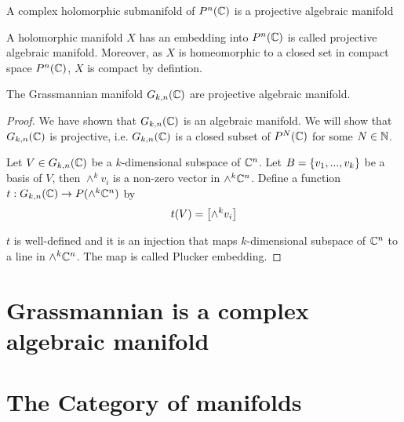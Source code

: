 \begin{theorem}
	A complex holomorphic submanifold of $P^n(\C)$ is a projective algebraic manifold
\end{theorem}

\begin{definition}
	A holomorphic manifold $X$ has an embedding into $P^n(\C)$ is called projective algebraic manifold.
	Moreover, as $X$ is homeomorphic to a closed set in compact space $P^n(\C)$, $X$ is compact by defintion.
\end{definition}

\begin{proposition}
	The Grassmannian manifold $G_{k, n}(\C)$ are projective algebraic manifold.
\end{proposition}

\begin{proof}
	We have shown that $G_{k, n}(\C)$ is an algebraic manifold. We will show that $G_{k, n}(\C)$ is projective, i.e. $G_{k, n}(\C)$ is a closed subset of $P^N(\C)$ for some $N \in \N$.
	
	Let $V \in G_{k, n}(\C)$ be a $k$-dimensional subspace of $\C^n$. Let $B = \set{v_1, ..., v_k}$ be a basis of $V$, then $\wedge^k v_i$ is a non-zero vector in $\wedge^k \C^n$. Define a function $t: G_{k,n}(\C) \to P(\wedge^k \C^n)$ by
	$$
	t(V) = \bracket*{\wedge^k v_i}
	$$
	
	$t$ is well-defined and it is an injection that maps $k$-dimensional subspace of $\C^n$ to a line in $\wedge^k \C^n$. The map is called Plucker embedding.
	
\end{proof}

\section{Grassmannian is a complex algebraic manifold}


\section{The Category of manifolds}

